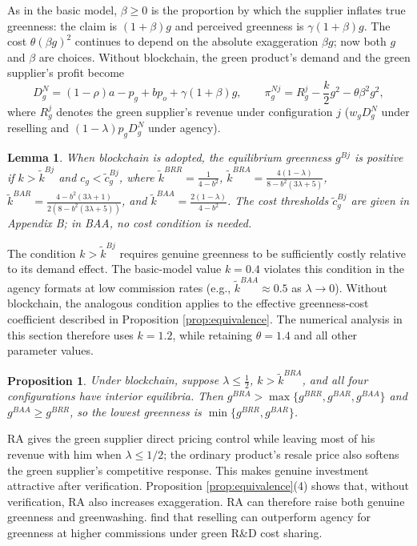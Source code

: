 \documentclass[preprint,review,12pt,authoryear,nopreprintline]{elsarticle}
\newtheorem{lemma}{Lemma}
\newtheorem{proposition}{Proposition}
\theoremstyle{definition}
\begin{document}
As in the basic model, $\beta\geq0$ is the proportion by which the supplier inflates true greenness: the claim is $(1+\beta)g$ and perceived greenness is $\gamma(1+\beta)g$. The cost $\theta(\beta g)^2$ continues to depend on the absolute exaggeration $\beta g$; now both $g$ and $\beta$ are choices. Without blockchain, the green product's demand and the green supplier's profit become
\begin{equation}\label{eq:ext}
D_g^{N}=(1-\rho)a-p_g+bp_o+\gamma(1+\beta)g,\qquad \pi_g^{Nj}=R_g^{j}-\frac{k}{2}g^2-\theta\beta^2g^2,
\end{equation}
where $R_g^{j}$ denotes the green supplier's revenue under configuration $j$ ($w_gD_g^N$ under reselling and $(1-\lambda)p_gD_g^N$ under agency).

\begin{lemma}\label{lem:endog-g}
When blockchain is adopted, the equilibrium greenness $g^{Bj}$ is positive if $k>\tilde{k}^{Bj}$ and $c_g<\tilde{c}_g^{Bj}$, where $\tilde{k}^{BRR}=\frac{1}{4-b^2}$, $\tilde{k}^{BRA}=\frac{4(1-\lambda)}{8-b^2(3\lambda+5)}$, $\tilde{k}^{BAR}=\frac{4-b^2(3\lambda+1)}{2(8-b^2(3\lambda+5))}$, and $\tilde{k}^{BAA}=\frac{2(1-\lambda)}{4-b^2}$. The cost thresholds $\tilde{c}_g^{Bj}$ are given in Appendix B; in BAA, no cost condition is needed.
\end{lemma}

The condition $k>\tilde{k}^{Bj}$ requires genuine greenness to be sufficiently costly relative to its demand effect. The basic-model value $k=0.4$ violates this condition in the agency formats at low commission rates (e.g., $\tilde{k}^{BAA}\approx0.5$ as $\lambda\to0$). Without blockchain, the analogous condition applies to the effective greenness-cost coefficient described in Proposition \ref{prop:equivalence}. The numerical analysis in this section therefore uses $k=1.2$, while retaining $\theta=1.4$ and all other parameter values.

\begin{proposition}\label{prop:greenness}
Under blockchain, suppose $\lambda\leq\frac12$, $k>\tilde{k}^{BRA}$, and all four configurations have interior equilibria. Then $g^{BRA}>\max\{g^{BRR},g^{BAR},g^{BAA}\}$ and $g^{BAA}\geq g^{BRR}$, so the lowest greenness is $\min\{g^{BRR},g^{BAR}\}$.
\end{proposition}

RA gives the green supplier direct pricing control while leaving most of his revenue with him when $\lambda\leq1/2$; the ordinary product's resale price also softens the green supplier's competitive response. This makes genuine investment attractive after verification. Proposition \ref{prop:equivalence}(4) shows that, without verification, RA also increases exaggeration. RA can therefore raise both genuine greenness and greenwashing. \citet{wuZhao2027cooperative} find that reselling can outperform agency for greenness at higher commissions under green R\&D cost sharing.
\end{document}
